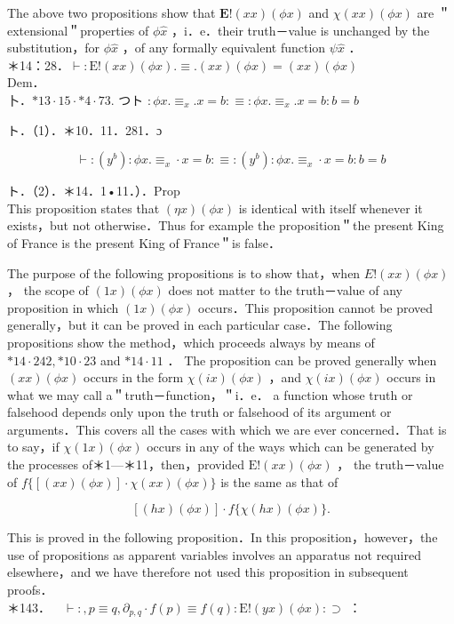 \documentclass[10pt]{article}
\begin{document}
The above two propositions show that $\mathbf{E}!(x x)(\phi x)$ and $\chi(x x)(\phi x)$ are ＂extensional＂properties of $\phi \hat{x}$ ，i．e．their truth－value is unchanged by the substitution，for $\phi \hat{x}$ ，of any formally equivalent function $\psi \hat{x}$ ．\\
＊14：28．$\vdash: \mathrm{E}!(x x)(\phi x) . \equiv .(x x)(\phi x)=(x x)(\phi x)$\\
Dem．\\
卜．$* 13 \cdot 15 \cdot * 4 \cdot 73$. つト $: \phi x . \equiv_{x} . x=b: \equiv: \phi x . \equiv_{x} . x=b: b=b$

ト．（1）．＊10．11．281．ɔ


\begin{equation*}
\vdash:\left(y^{b}\right): \phi x . \equiv_{x} \cdot x=b: \equiv:\left(y^{b}\right): \phi x . \equiv_{x} \cdot x=b: b=b \tag{1}
\end{equation*}


ト．（2）．＊14．1•11．）．Prop\\
This proposition states that $(\eta x)(\phi x)$ is identical with itself whenever it exists，but not otherwise．Thus for example the proposition＂the present King of France is the present King of France＂is false．

The purpose of the following propositions is to show that，when $E!(x x)(\phi x)$ ， the scope of $(1 x)(\phi x)$ does not matter to the truth－value of any proposition in which $(1 x)(\phi x)$ occurs．This proposition cannot be proved generally，but it can be proved in each particular case．The following propositions show the method，which proceeds always by means of $* 14 \cdot 242, * 10 \cdot 23$ and $* 14 \cdot 11$ ． The proposition can be proved generally when $(x x)(\phi x)$ occurs in the form $\chi(i x)(\phi x)$ ，and $\chi(i x)(\phi x)$ occurs in what we may call a＂truth－function，＂i．e． a function whose truth or falsehood depends only upon the truth or falsehood of its argument or arguments．This covers all the cases with which we are ever concerned．That is to say，if $\chi(1 x)(\phi x)$ occurs in any of the ways which can be generated by the processes of＊1—＊11，then，provided $\mathrm{E}!(x x)(\phi x)$ ， the truth－value of $f\{[(x x)(\phi x)] \cdot \chi(x x)(\phi x)\}$ is the same as that of

$$
[(h x)(\phi x)] \cdot f\{\chi(h x)(\phi x)\} .
$$

This is proved in the following proposition．In this proposition，however，the use of propositions as apparent variables involves an apparatus not required elsewhere，and we have therefore not used this proposition in subsequent proofs．\\
＊143．$\quad \vdash:, p \equiv q, \partial_{p, q} \cdot f(p) \equiv f(q): \mathrm{E}!(y x)(\phi x): \supset$ ：
\end{document}
